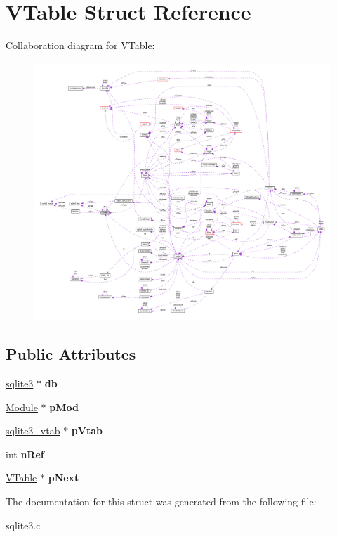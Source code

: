 \hypertarget{struct_v_table}{\section{V\-Table Struct Reference}
\label{struct_v_table}
}


Collaboration diagram for V\-Table\-:\nopagebreak
\begin{figure}[H]
\begin{center}
\leavevmode
\includegraphics[width=350pt]{struct_v_table__coll__graph}
\end{center}
\end{figure}
\subsection*{Public Attributes}
\begin{DoxyCompactItemize}
\item 
\hypertarget{struct_v_table_a855b43c118d693910e9060cc9d9ac91a}{\hyperlink{structsqlite3}{sqlite3} $\ast$ {\bfseries db}}\label{struct_v_table_a855b43c118d693910e9060cc9d9ac91a}

\item 
\hypertarget{struct_v_table_ae444452a7168e2f4224a75768abe8312}{\hyperlink{struct_module}{Module} $\ast$ {\bfseries p\-Mod}}\label{struct_v_table_ae444452a7168e2f4224a75768abe8312}

\item 
\hypertarget{struct_v_table_ae15b9cb002c013019dcbac919bda9ac8}{\hyperlink{structsqlite3__vtab}{sqlite3\-\_\-vtab} $\ast$ {\bfseries p\-Vtab}}\label{struct_v_table_ae15b9cb002c013019dcbac919bda9ac8}

\item 
\hypertarget{struct_v_table_a12ffe156e5e8e7d19ed029ccfe4ab5dc}{int {\bfseries n\-Ref}}\label{struct_v_table_a12ffe156e5e8e7d19ed029ccfe4ab5dc}

\item 
\hypertarget{struct_v_table_af3cac5e5a38508d0111acb9aa6c5f435}{\hyperlink{struct_v_table}{V\-Table} $\ast$ {\bfseries p\-Next}}\label{struct_v_table_af3cac5e5a38508d0111acb9aa6c5f435}

\end{DoxyCompactItemize}


The documentation for this struct was generated from the following file\-:\begin{DoxyCompactItemize}
\item 
sqlite3.\-c\end{DoxyCompactItemize}

